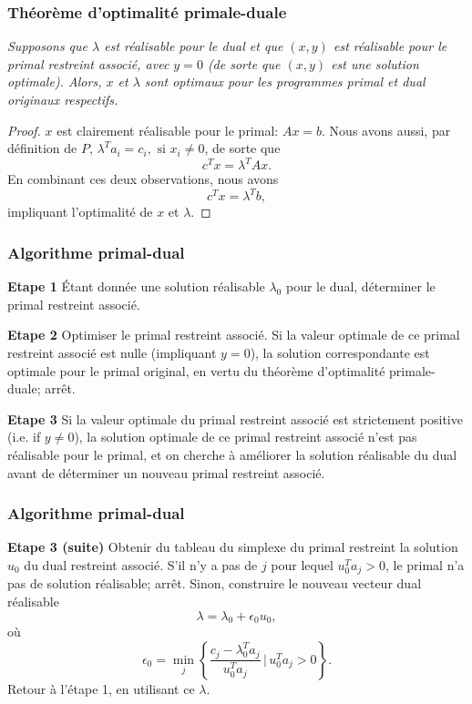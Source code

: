 \documentclass[t,usepdftitle=false]{beamer}
\begin{document}
\begin{frame}
\frametitle{Théorème d'optimalité primale-duale}

{\sl Supposons que $\lambda$ est réalisable pour le dual et que $(x,y)$ est réalisable pour le primal restreint associé, avec $y = 0$ (de sorte que $(x,y)$ est une solution optimale). Alors, $x$ et $\lambda$ sont optimaux pour les programmes primal et dual originaux respectifs.}

\begin{proof}
$x$ est clairement réalisable pour le primal: $Ax = b$.
Nous avons aussi, par définition de $P$,
$\lambda^T a_i = c_i,\mbox{ si } x_i \ne 0$,
de sorte que
\[
c^T x = \lambda^T Ax.
\]
En combinant ces deux observations, nous avons
\[
c^T x = \lambda^T b,
\]
impliquant l'optimalité de $x$ et $\lambda$.
\end{proof}

\end{frame}

\begin{frame}
\frametitle{Algorithme primal-dual}

{\bf Etape 1}
Étant donnée une solution réalisable $\lambda_0$ pour le dual, déterminer le primal restreint associé.

\mbox{}

{\bf Etape 2}
Optimiser le primal restreint associé.
Si la valeur optimale de ce primal restreint associé est nulle (impliquant $y = 0$), la solution correspondante est optimale pour le primal original, en vertu du théorème d'optimalité primale-duale; arrêt.


\mbox{}

{\bf Etape 3}
Si la valeur optimale du primal restreint associé est strictement positive
(i.e. if $y \ne 0$), la solution optimale de ce primal restreint associé n'est pas réalisable pour le primal, et on cherche à améliorer la solution réalisable du dual avant de déterminer un nouveau primal restreint associé.

\end{frame}

\begin{frame}
\frametitle{Algorithme primal-dual}

{\bf Etape 3 (suite)}
Obtenir du tableau du simplexe du primal restreint la solution $u_0$ du dual restreint associé.
S'il n'y a pas de $j$ pour lequel $u_0^T a_j > 0$, le primal n'a pas de solution réalisable; arrêt.
Sinon, construire le nouveau vecteur dual réalisable
\[
\lambda = \lambda_0 + \epsilon_0 u_0,
\]
où
\[
\epsilon_0 = \min_j \left\lbrace \frac{c_j - \lambda_0^Ta_j}{u_0^T a_j} \,\bigg|\, u_0^Ta_j > 0\right\rbrace.
\]
Retour à l'étape 1, en utilisant ce $\lambda$.

\end{frame}
\end{document}
